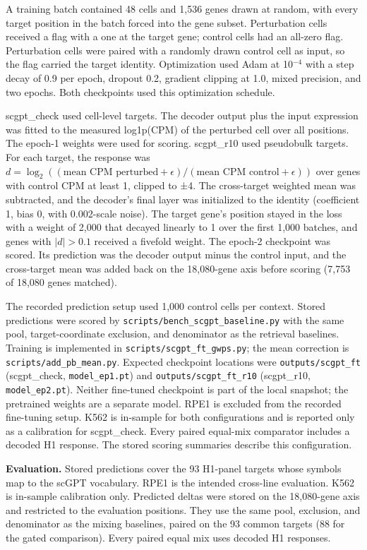 \documentclass[12pt]{article}
\begin{document}
\begin{singlespace}
A training batch contained 48 cells and 1,536 genes drawn at random, with every target position in the batch forced into the gene subset. Perturbation cells received a flag with a one at the target gene; control cells had an all-zero flag. Perturbation cells were paired with a randomly drawn control cell as input, so the flag carried the target identity. Optimization used Adam at 10$^{-4}$ with a step decay of 0.9 per epoch, dropout 0.2, gradient clipping at 1.0, mixed precision, and two epochs. Both checkpoints used this optimization schedule.

scgpt\_check used cell-level targets. The decoder output plus the input expression was fitted to the measured log1p(CPM) of the perturbed cell over all positions. The epoch-1 weights were used for scoring. scgpt\_r10 used pseudobulk targets. For each target, the response was $d = \log_2((\text{mean CPM perturbed} + \epsilon)/(\text{mean CPM control} + \epsilon))$ over genes with control CPM at least 1, clipped to ±4. The cross-target weighted mean was subtracted, and the decoder's final layer was initialized to the identity (coefficient 1, bias 0, with 0.002-scale noise). The target gene's position stayed in the loss with a weight of 2,000 that decayed linearly to 1 over the first 1,000 batches, and genes with $|d| > 0.1$ received a fivefold weight. The epoch-2 checkpoint was scored. Its prediction was the decoder output minus the control input, and the cross-target mean was added back on the 18,080-gene axis before scoring (7,753 of 18,080 genes matched).

The recorded prediction setup used 1,000 control cells per context. Stored predictions were scored by \texttt{scripts/bench\_scgpt\_baseline.py} with the same pool, target-coordinate exclusion, and denominator as the retrieval baselines. Training is implemented in \texttt{scripts/scgpt\_ft\_gwps.py}; the mean correction is \texttt{scripts/add\_pb\_mean.py}. Expected checkpoint locations were \texttt{outputs/scgpt\_ft} (scgpt\_check, \texttt{model\_ep1.pt}) and \texttt{outputs/scgpt\_ft\_r10} (scgpt\_r10, \texttt{model\_ep2.pt}). Neither fine-tuned checkpoint is part of the local snapshot; the pretrained weights are a separate model. RPE1 is excluded from the recorded fine-tuning setup. K562 is in-sample for both configurations and is reported only as a calibration for scgpt\_check. Every paired equal-mix comparator includes a decoded H1 response. The stored scoring summaries describe this configuration.

\noindent\textbf{Evaluation.} Stored predictions cover the 93 H1-panel targets whose symbols map to the scGPT vocabulary. RPE1 is the intended cross-line evaluation. K562 is in-sample calibration only. Predicted deltas were stored on the 18,080-gene axis and restricted to the evaluation positions. They use the same pool, exclusion, and denominator as the mixing baselines, paired on the 93 common targets (88 for the gated comparison). Every paired equal mix uses decoded H1 responses.


\end{singlespace}
\end{document}
